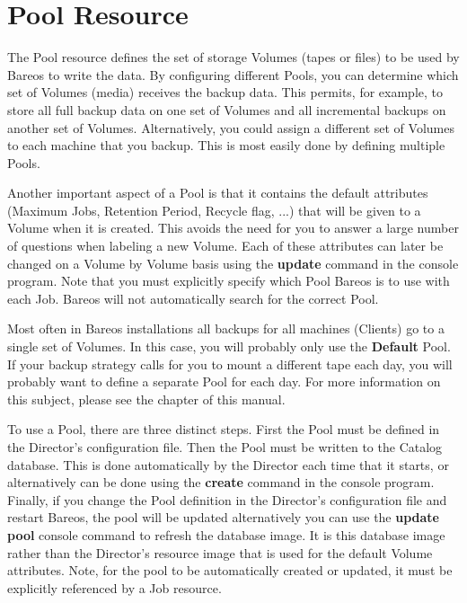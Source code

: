 \section{Pool Resource}
\label{DirectorResourcePool}

The Pool resource defines the set of storage Volumes (tapes or files) to be
used by Bareos to write the data. By configuring different Pools, you can
determine which set of Volumes (media) receives the backup data. This permits,
for example, to store all full backup data on one set of Volumes and all
incremental backups on another set of Volumes. Alternatively, you could assign
a different set of Volumes to each machine that you backup. This is most
easily done by defining multiple Pools.

Another important aspect of a Pool is that it contains the default attributes
(Maximum Jobs, Retention Period, Recycle flag, ...) that will be given to a
Volume when it is created. This avoids the need for you to answer a large
number of questions when labeling a new Volume. Each of these attributes can
later be changed on a Volume by Volume basis using the {\bf update} command in
the console program. Note that you must explicitly specify which Pool Bareos
is to use with each Job. Bareos will not automatically search for the correct
Pool.

Most often in Bareos installations all backups for all machines (Clients) go
to a single set of Volumes. In this case, you will probably only use the {\bf
Default} Pool. If your backup strategy calls for you to mount a different tape
each day, you will probably want to define a separate Pool for each day. For
more information on this subject, please see the
 chapter of this
manual.

To use a Pool, there are three distinct steps. First the Pool must be defined
in the Director's configuration file. Then the Pool must be written to the
Catalog database. This is done automatically by the Director each time that it
starts, or alternatively can be done using the {\bf create} command in the
console program. Finally, if you change the Pool definition in the Director's
configuration file and restart Bareos, the pool will be updated alternatively
you can use the {\bf update pool} console command to refresh the database
image. It is this database image rather than the Director's resource image
that is used for the default Volume attributes. Note, for the pool to be
automatically created or updated, it must be explicitly referenced by a Job
resource.

